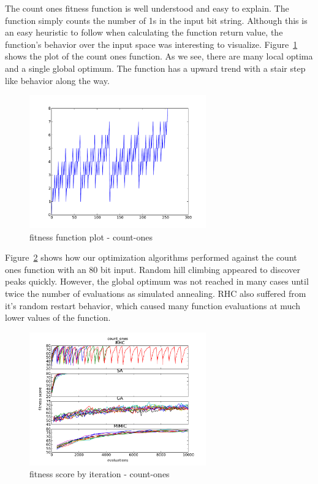 \documentclass{sig-alternate}
\begin{document}
The count ones fitness function is well understood and easy to explain. The function simply counts the number of 1s in the input bit string. Although this is an easy heuristic to follow when calculating the function return value, the function's behavior over the input space was interesting to visualize. Figure~\ref{plot-count-ones} shows the plot of the count ones function. As we see, there are many local optima and a single global optimum. The function has a upward trend with a stair step like behavior along the way.

\begin{figure}[!htbp]
    \centering
    \includegraphics[width=3in]{part1.2/count-ones-plot.pdf}
    \caption{fitness function plot - count-ones\label{plot-count-ones}}
\end{figure} 

Figure~\ref{over-time-count-ones} shows how our optimization algorithms performed against the count ones function with an 80 bit input. Random hill climbing appeared to discover peaks quickly. However, the global optimum was not reached in many cases until twice the number of evaluations as simulated annealing. RHC also suffered from it's random restart behavior, which caused many function evaluations at much lower values of the function.

\begin{figure}[!htbp]
    \centering
    \includegraphics[width=3in]{part1.2/count-ones-over-time.pdf}
    \caption{fitness score by iteration - count-ones\label{over-time-count-ones}}
\end{figure} 
\end{document}
